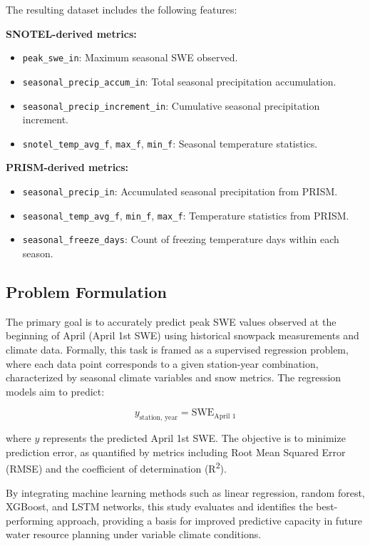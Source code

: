 \documentclass{article}
\begin{document}
The resulting dataset includes the following features:

\textbf{SNOTEL-derived metrics:}
\begin{itemize}
    \item \texttt{peak\_swe\_in}: Maximum seasonal SWE observed.
    \item \texttt{seasonal\_precip\_accum\_in}: Total seasonal precipitation accumulation.
    \item \texttt{seasonal\_precip\_increment\_in}: Cumulative seasonal precipitation increment.
    \item \texttt{snotel\_temp\_avg\_f}, \texttt{max\_f}, \texttt{min\_f}: Seasonal temperature statistics.
\end{itemize}

\textbf{PRISM-derived metrics:}
\begin{itemize}
    \item \texttt{seasonal\_precip\_in}: Accumulated seasonal precipitation from PRISM.
    \item \texttt{seasonal\_temp\_avg\_f}, \texttt{min\_f}, \texttt{max\_f}: Temperature statistics from PRISM.
    \item \texttt{seasonal\_freeze\_days}: Count of freezing temperature days within each season.
\end{itemize}

\subsection{Problem Formulation}

The primary goal is to accurately predict peak SWE values observed at the beginning of April (April 1st SWE) using historical snowpack measurements and climate data. Formally, this task is framed as a supervised regression problem, where each data point corresponds to a given station-year combination, characterized by seasonal climate variables and snow metrics. The regression models aim to predict:

\[
y_{\text{station, year}} = \text{SWE}_{\text{April 1}}
\]

where \( y \) represents the predicted April 1st SWE. The objective is to minimize prediction error, as quantified by metrics including Root Mean Squared Error (RMSE) and the coefficient of determination (R\textsuperscript{2}).

By integrating machine learning methods such as linear regression, random forest, XGBoost, and LSTM networks, this study evaluates and identifies the best-performing approach, providing a basis for improved predictive capacity in future water resource planning under variable climate conditions.
\end{document}
